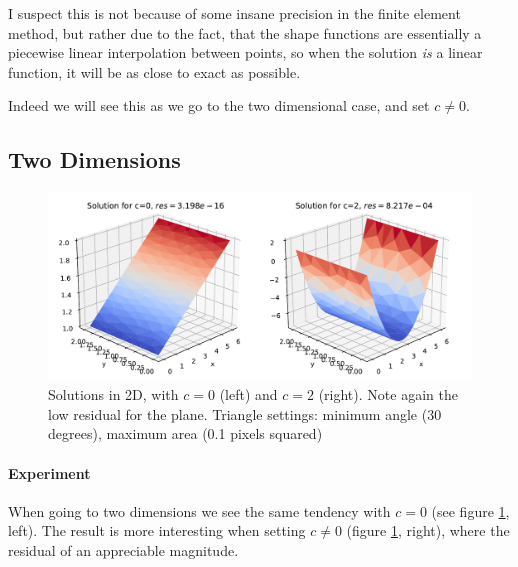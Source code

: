 \documentclass[sigconf]{acmart}
\begin{document}
I suspect this is not because of some insane precision in the finite element method, but rather due to the fact, that the shape functions are essentially a piecewise linear interpolation between points, so when the solution \textit{is} a linear function, it will be as close to exact as possible.

Indeed we will see this as we go to the two dimensional case, and set $ c\neq 0 $.

\subsection{Two Dimensions}
\begin{figure}
	\includegraphics[width=\linewidth]{experiment2D.pdf}
	\caption{Solutions in 2D, with $ c=0 $ (left) and $ c=2 $ (right). Note again the low residual for the plane. Triangle settings: minimum angle (30 degrees), maximum area (0.1 pixels squared)}
	\label{fig:exp2D}
\end{figure}
\paragraph{Experiment}
When going to two dimensions we see the same tendency with $ c=0 $ (see figure \ref{fig:exp2D}, left). The result is more interesting when setting $ c\neq 0 $ (figure \ref{fig:exp2D}, right), where the residual of an appreciable magnitude.
\end{document}
